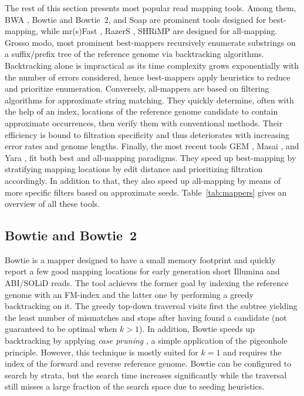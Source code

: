The rest of this section presents most popular read mapping tools.
Among them, BWA \citep{Li2009}, Bowtie \citep{Langmead2009} and Bowtie~2\citep{Langmead2012}, and Soap \citep{Li2009b} are prominent tools designed for best-mapping, while mr(s)Fast \citep{Alkan2009,Hach2010}, RazerS \citep{Weese2009,Weese2012}, SHRiMP \citep{Rumble2009,David2011} are designed for all-mapping.
Grosso modo, most prominent best-mappers recursively enumerate substrings on a suffix/prefix tree of the reference genome via backtracking algorithms.
Backtracking alone is impractical as its time complexity grows exponentially with the number of errors considered, hence best-mappers apply heuristics to reduce and prioritize enumeration.
Conversely, all-mappers are based on filtering algorithms for approximate string matching.
They quickly determine, often with the help of an index, locations of the reference genome candidate to contain approximate occurrences, then verify them with conventional methods.
Their efficiency is bound to filtration specificity and thus deteriorates with increasing error rates and genome lengths.
Finally, the most recent tools GEM \citep{MarcoSola2012}, Masai \citep{Siragusa2013}, and Yara \citep{Siragusa2014}, fit both best and all-mapping paradigms.
They speed up best-mapping by stratifying mapping locations by edit distance and prioritizing filtration accordingly.
In addition to that, they also speed up all-mapping by means of more specific filters based on approximate seeds.
Table~\ref{tab:mappers} gives an overview of all these tools.


\subsection{Bowtie and Bowtie~2}
\label{background:mappers:bowtie}

Bowtie \citep{Langmead2009} is a mapper designed to have a small memory footprint and quickly report a few good mapping locations for early generation short Illumina and ABI/SOLiD reads.
The tool achieves the former goal by indexing the reference genome with an FM-index and the latter one by performing a greedy backtracking on it.
The greedy top-down traversal visits first the subtree yielding the least number of mismatches and stops after having found a candidate (not guaranteed to be optimal when $k>1$).
In addition, Bowtie speeds up backtracking by applying \emph{case pruning} \citep{Maekinen2010}, a simple application of the pigeonhole principle.
However, this technique is mostly suited for $k=1$ and requires the index of the forward and reverse reference genome.
Bowtie can be configured to search by strata, but the search time increases significantly while the traversal still misses a large fraction of the search space due to seeding heuristics.

